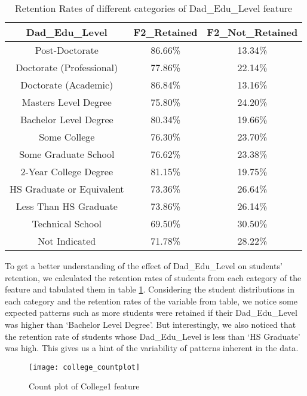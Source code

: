 \documentclass[11pt,openright]{report}
\begin{document}
\begin{table}
	\renewcommand{\arraystretch}{1.3}
	\caption{Retention Rates of different categories of Dad\_Edu\_Level feature}
	\label{table:dad_edu_retentions}
	\centering
	\begin{tabular}{|c|c|c|}
		\hline
		\bfseries Dad\_Edu\_Level & \bfseries F2\_Retained & \bfseries F2\_Not\_Retained\\
		\hline
		Post-Doctorate  & 86.66\%  & 13.34\% \\ \hline
		Doctorate (Professional) & 77.86\% &  22.14\% \\ \hline
		Doctorate (Academic) & 86.84\% & 13.16\% \\ \hline
		Masters Level Degree    &   75.80\% &  24.20\% \\ \hline
		Bachelor Level Degree &  80.34\%  & 19.66\% \\ \hline
		Some College & 76.30\% & 23.70\% \\ \hline
		Some Graduate School  & 76.62\% &  23.38\% \\ \hline
		2-Year College Degree    &  81.15\%  & 19.75\% \\ \hline
		HS Graduate or Equivalent  & 73.36\% &  26.64\% \\ \hline
		Less Than HS Graduate     & 73.86\% &  26.14\% \\ \hline
		Technical School  &         69.50\% &  30.50\% \\ \hline
		Not Indicated         &    71.78\% & 28.22\% \\ \hline
	\end{tabular}
\end{table}

To get a better understanding of the effect of Dad\_Edu\_Level on students' retention, we calculated the retention rates of students from each category of the feature and tabulated them in table \ref{table:dad_edu_retentions}. Considering the student distributions in each category and the retention rates of the variable from table, we notice some expected patterns such as more students were retained if their Dad\_Edu\_Level was higher than `Bachelor Level Degree'. But interestingly, we also noticed that the retention rate of students whose Dad\_Edu\_Level is less than `HS Graduate' was high. This gives us a hint of the variability of patterns inherent in the data.

\begin{figure}
	\centering
	\texttt{[image: college\_countplot]}
	\caption{Count plot of College1 feature}
	\label{fig:college_F2NotRetained_plot}
\end{figure}
\end{document}

